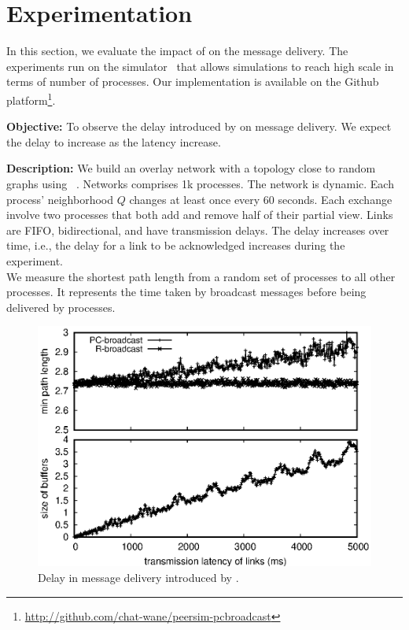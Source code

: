 
\section{Experimentation}
\label{sec:experimentation}


In this section, we evaluate the impact of \CBROADCAST on the message
delivery. The experiments run on the \PEERSIM
simulator~\cite{montresor2009peersim} that allows simulations to reach high
scale in terms of number of processes. Our implementation is available on the
Github platform\footnote{\url{http://github.com/chat-wane/peersim-pcbroadcast}}.


\noindent \textbf{Objective:} To observe the delay introduced by \CBROADCAST on
message delivery. We expect the delay to increase as the latency increase.

\noindent \textbf{Description:} We build an overlay network with a topology
close to random graphs using \SPRAY~\cite{nedelec2017adaptive}. Networks
comprises 1k processes. The network is dynamic. Each process' neighborhood $Q$
changes at least once every 60 seconds. Each exchange involve two processes that
both add and remove half of their partial view.  Links are FIFO, bidirectional,
and have transmission delays. The delay increases over time, i.e., the delay for 
a link to be acknowledged increases during the experiment.\\
We measure the shortest path length from a random set of processes to all other
processes. It represents the time taken by broadcast messages before being
delivered by processes.

\begin{figure}
  \begin{center}
    \includegraphics[width=1.4\columnwidth]{./img/delay.eps}
    \caption{\label{fig:delay}Delay in message delivery introduced by \CBROADCAST.}
  \end{center}
\end{figure}

